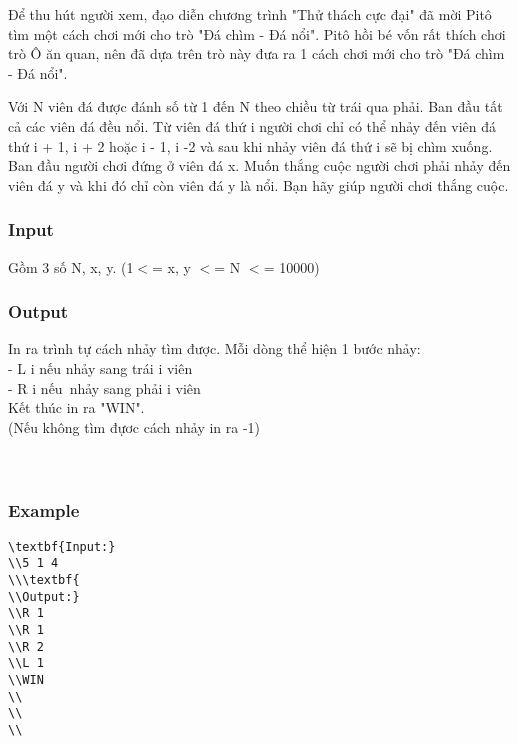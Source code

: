 



   Để thu hút người xem, đạo diễn chương trình "Thử thách cực đại" đã mời Pitô tìm một cách chơi mới cho trò "Đá chìm - Đá nổi". Pitô hồi bé vốn rất thích chơi trò Ô ăn quan, nên đã dựa trên trò này đưa ra 1 cách chơi mới cho trò "Đá chìm - Đá nổi".  

   Với N viên đá được đánh số từ 1 đến N theo chiều từ trái qua phải. Ban đầu tất cả các viên đá đều nổi. Từ viên đá thứ i người chơi chỉ có thể nhảy đến viên đá thứ i + 1, i + 2 hoặc i - 1, i -2 và sau khi nhảy viên đá thứ i sẽ bị chìm xuống. Ban đầu người chơi đứng ở viên đá x. Muốn thắng cuộc người chơi phải nhảy đến viên đá y và khi đó chỉ còn viên đá y là nổi. Bạn hãy giúp người chơi thắng cuộc.  



\subsubsection{   Input  }

   Gồm 3 số N, x, y. (1$<$= x, y $<$= N $<$= 10000)  

\subsubsection{   Output  }

   In ra trình tự cách nhảy tìm được. Mỗi dòng thể hiện 1 bước nhảy:   
\\   - L i  nếu nhảy sang trái i viên   
\\   - R i  nếu nhảy sang phải i viên   
\\   Kết thúc in ra "WIN".   
\\   (Nếu không tìm đựơc cách nhảy in ra -1)   
\\
\\
\\

\subsubsection{   Example  }


\begin{verbatim}
\textbf{Input:}
\\5 1 4
\\\textbf{
\\Output:}
\\R 1
\\R 1
\\R 2
\\L 1
\\WIN
\\
\\
\\\end{verbatim}